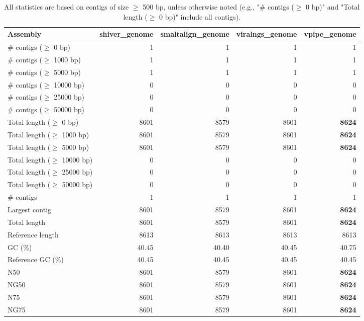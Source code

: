 \documentclass[12pt,a4paper]{article}
\begin{document}
\begin{table}[ht]
\begin{center}
\caption{All statistics are based on contigs of size $\geq$ 500 bp, unless otherwise noted (e.g., "\# contigs ($\geq$ 0 bp)" and "Total length ($\geq$ 0 bp)" include all contigs).}
\begin{tabular}{|l*{4}{|r}|}
\hline
Assembly & shiver\_genome & smaltalign\_genome & viralngs\_genome & vpipe\_genome \\ \hline
\# contigs ($\geq$ 0 bp) & 1 & 1 & 1 & 1 \\ \hline
\# contigs ($\geq$ 1000 bp) & 1 & 1 & 1 & 1 \\ \hline
\# contigs ($\geq$ 5000 bp) & 1 & 1 & 1 & 1 \\ \hline
\# contigs ($\geq$ 10000 bp) & 0 & 0 & 0 & 0 \\ \hline
\# contigs ($\geq$ 25000 bp) & 0 & 0 & 0 & 0 \\ \hline
\# contigs ($\geq$ 50000 bp) & 0 & 0 & 0 & 0 \\ \hline
Total length ($\geq$ 0 bp) & 8601 & 8579 & 8601 & {\bf 8624} \\ \hline
Total length ($\geq$ 1000 bp) & 8601 & 8579 & 8601 & {\bf 8624} \\ \hline
Total length ($\geq$ 5000 bp) & 8601 & 8579 & 8601 & {\bf 8624} \\ \hline
Total length ($\geq$ 10000 bp) & 0 & 0 & 0 & 0 \\ \hline
Total length ($\geq$ 25000 bp) & 0 & 0 & 0 & 0 \\ \hline
Total length ($\geq$ 50000 bp) & 0 & 0 & 0 & 0 \\ \hline
\# contigs & 1 & 1 & 1 & 1 \\ \hline
Largest contig & 8601 & 8579 & 8601 & {\bf 8624} \\ \hline
Total length & 8601 & 8579 & 8601 & {\bf 8624} \\ \hline
Reference length & 8613 & 8613 & 8613 & 8613 \\ \hline
GC (\%) & 40.45 & 40.40 & 40.45 & 40.75 \\ \hline
Reference GC (\%) & 40.45 & 40.45 & 40.45 & 40.45 \\ \hline
N50 & 8601 & 8579 & 8601 & {\bf 8624} \\ \hline
NG50 & 8601 & 8579 & 8601 & {\bf 8624} \\ \hline
N75 & 8601 & 8579 & 8601 & {\bf 8624} \\ \hline
NG75 & 8601 & 8579 & 8601 & {\bf 8624} \\ \hline

\end{tabular}
\end{center}
\end{table}
\end{document}
